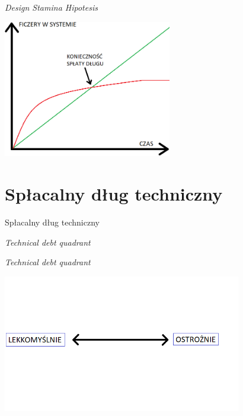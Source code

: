 \documentclass{beamer}
\begin{document}
\begin{frame}{\textit{Design Stamina Hipotesis}}
\begin{center}
  	\includegraphics[height=6cm]{design_stability_hipotesis4.png}
\end{center}
\end{frame}

\section{Spłacalny dług techniczny}

\begin{frame}{}
\begin{center}
\Huge{Spłacalny dług techniczny}
\end{center}
\end{frame}

\begin{frame}{}
\begin{center}
\Huge{\textit{Technical debt quadrant}}
\end{center}
\end{frame}

\begin{frame}{\textit{Technical debt quadrant}}
\begin{center}
  	\includegraphics[height=6cm]{technical_debt_quadrant1.png}
\end{center}
\end{frame}
\end{document}
